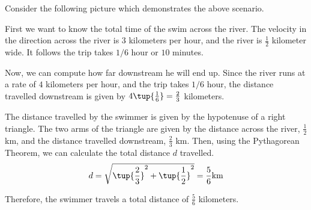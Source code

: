 \begin{solution}
Consider the following picture which demonstrates the above scenario. 

\begin{center}
\end{center}

First we want to know the total time of the swim across the river. 
The velocity in the direction across the river is
$3$ kilometers per hour, and the river is $\frac{1}{2}$ kilometer wide. It follows the trip
takes $1/6$ hour or $10$ minutes. 

Now, we can compute how far downstream he will end up. Since the river runs at a rate of 
$4$ kilometers per hour, and the trip takes $1/6$ hour, the distance travelled downstream 
is given by $4 \tup{\frac{1}{6}} = \frac{2}{3}$ kilometers. 

The distance travelled by the swimmer is given by the hypotenuse of a right triangle. 
The two arms of the triangle are given by the distance across the river, $\frac{1}{2}$km, and 
the distance travelled downstream, $\frac{2}{3}$ km. Then, using the Pythagorean Theorem, we can calculate
the total distance $d$ travelled.
\begin{equation*}
d
=
\sqrt{ \tup{\frac{2}{3} }^2 + \tup{\frac{1}{2} } ^2 }
=
\frac{5}{6} \mbox{km}
\end{equation*}

Therefore, the swimmer travels a total distance of $\frac{5}{6}$ kilometers. 
\end{solution}
